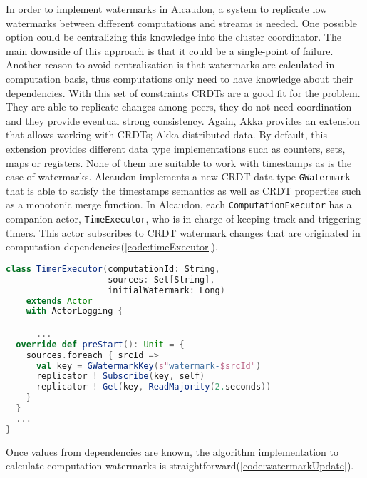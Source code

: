 In order to implement watermarks in Alcaudon, a system to replicate low
watermarks between different computations and streams is needed. One possible
option could be centralizing this knowledge into the cluster coordinator. The main
downside of this approach is that it could be a single-point of failure. Another
reason to avoid centralization is that watermarks are calculated in computation
basis, thus computations only need to have knowledge about their dependencies.
With this set of constraints \acs{CRDT}s are a good fit for the problem. They
are able to replicate changes among peers, they do not need coordination and
they provide eventual strong consistency. Again, Akka provides an extension that
allows working with \acs{CRDT}s; Akka distributed data. By default, this
extension provides different data type implementations such as counters, sets,
maps or registers. None of them are suitable to work with timestamps as is the
case of watermarks. Alcaudon implements a new \acs{CRDT} data type
\lstinline{GWatermark} that is able to satisfy the timestamps semantics as well
as \acs{CRDT} properties such as a monotonic merge function.
In Alcaudon, each \lstinline[columns=fixed]{ComputationExecutor} has a companion
actor, \lstinline[columns=fixed]{TimeExecutor}, who is in charge of keeping track
and triggering timers. This actor subscribes to \acs{CRDT} watermark changes that are
originated in computation dependencies(\ref{code:timeExecutor}).

\begin{lstlisting}[language=scala, frame=trBL, label=code:timeExecutor, float=ht, caption = {TimerExecutor \acs{CRDT}s dependencies subscription}]
class TimerExecutor(computationId: String,
                    sources: Set[String],
                    initialWatermark: Long)
    extends Actor
    with ActorLogging {

      ...
  override def preStart(): Unit = {
    sources.foreach { srcId =>
      val key = GWatermarkKey(s"watermark-$srcId")
      replicator ! Subscribe(key, self)
      replicator ! Get(key, ReadMajority(2.seconds))
    }
  }
  ...
}
\end{lstlisting}

Once values from dependencies are known, the algorithm implementation to
calculate computation watermarks is straightforward(\ref{code:watermarkUpdate}).

